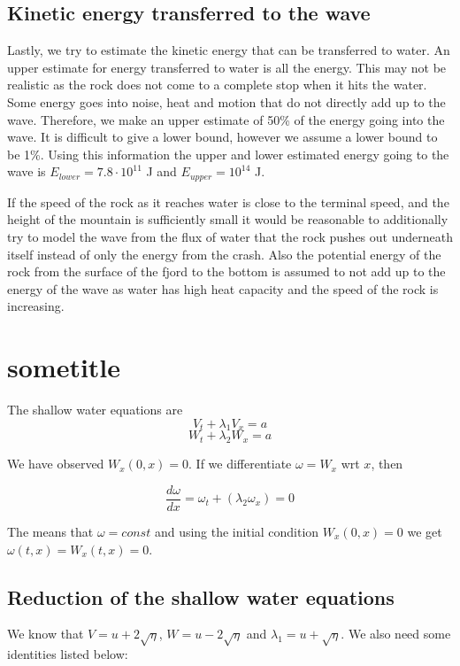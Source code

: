 \documentclass[11pt]{article}
\begin{document}
\subsection{Kinetic energy transferred to the wave}
Lastly, we try to estimate the kinetic energy that can be transferred to water. An upper estimate for energy transferred to water is all the energy. This may not be realistic as the rock does not
come to a complete stop when it hits the water. Some energy goes into noise, heat and motion that do not directly add up to the wave. Therefore, we make an upper estimate of 50\% of the energy going into the wave.
It is difficult to give a lower bound, however we assume a lower bound to be 1\%. Using this information the upper and lower estimated energy going to the wave is $E_{lower}=7.8 \cdot 10^{11}$ J and $E_{upper}=10^{14}$ J.

If the speed of the rock as it reaches water is close to the terminal speed, and the height of the mountain is sufficiently small it would be reasonable to additionally try to model the wave from the flux of water
that the rock pushes out underneath itself instead of only the energy from the crash. Also the potential energy of the rock from the surface of the fjord to the bottom is assumed to not add up to the energy of the wave
as water has high heat capacity and the speed of the rock is increasing. 

\section{sometitle}

The shallow water equations are 
\begin{equation}
V_t + \lambda_1 V_x = a
\label{eqana:shallow1}
\end{equation}
\begin{equation}
W_t + \lambda_2 W_x = a
\label{eqana:shallow2}
\end{equation}

We have observed $W_x(0,x) = 0$. If we differentiate $\omega = W_x$ wrt $x$, then

\begin{equation*}
\frac{d \omega}{d x} = \omega_t + \left( \lambda_2 \omega_x \right) = 0
\end{equation*}

The means that $\omega = const$ and using the initial condition $W_x(0,x) = 0$ we get $\omega(t,x) = W_x(t,x) = 0$.

\subsection{Reduction of the shallow water equations}
We know that $V = u + 2 \sqrt{\eta}$, $W = u - 2 \sqrt{\eta}$ and $\lambda_1 = u + \sqrt{\eta}$. We also need some identities listed below:
\end{document}
